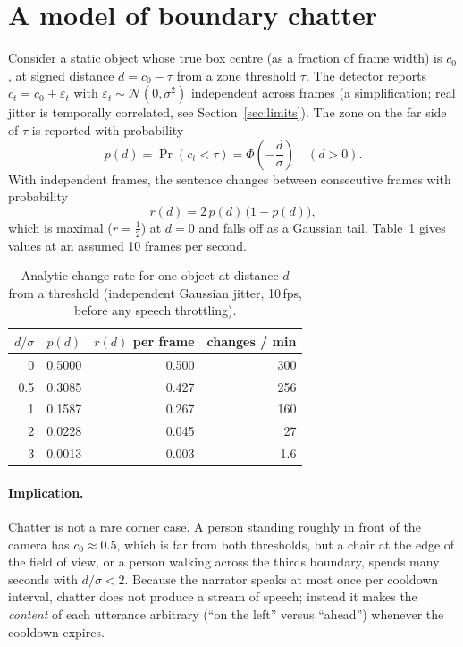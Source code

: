 \documentclass[11pt,a4paper]{article}
\begin{document}
\section{A model of boundary chatter}\label{sec:model}
Consider a static object whose true box centre (as a fraction of frame width) is $c_0$, at signed distance $d = c_0 - \tau$ from a zone threshold $\tau$. The detector reports $c_t = c_0 + \varepsilon_t$ with $\varepsilon_t \sim \mathcal{N}(0,\sigma^2)$ independent across frames (a simplification; real jitter is temporally correlated, see Section~\ref{sec:limits}). The zone on the far side of $\tau$ is reported with probability
\begin{equation}
  p(d) = \Pr(c_t < \tau) = \Phi\!\left(-\frac{d}{\sigma}\right) \quad (d>0).
\end{equation}
With independent frames, the sentence changes between consecutive frames with probability
\begin{equation}
  r(d) = 2\,p(d)\,\bigl(1-p(d)\bigr),
\end{equation}
which is maximal ($r=\tfrac12$) at $d=0$ and falls off as a Gaussian tail. Table~\ref{tab:chatter} gives values at an assumed 10 frames per second.

\begin{table}[h]
\centering
\caption{Analytic change rate for one object at distance $d$ from a threshold (independent Gaussian jitter, 10\,fps, before any speech throttling).}
\label{tab:chatter}
\begin{tabular}{rrrr}
\toprule
$d/\sigma$ & $p(d)$ & $r(d)$ per frame & changes / min \\
\midrule
0   & 0.5000 & 0.500 & 300 \\
0.5 & 0.3085 & 0.427 & 256 \\
1   & 0.1587 & 0.267 & 160 \\
2   & 0.0228 & 0.045 & 27 \\
3   & 0.0013 & 0.003 & 1.6 \\
\bottomrule
\end{tabular}
\end{table}

\paragraph{Implication.} Chatter is not a rare corner case. A person standing roughly in front of the camera has $c_0\approx 0.5$, which is far from both thresholds, but a chair at the edge of the field of view, or a person walking across the thirds boundary, spends many seconds with $d/\sigma<2$. Because the narrator speaks at most once per cooldown interval, chatter does not produce a stream of speech; instead it makes the \emph{content} of each utterance arbitrary (``on the left'' versus ``ahead'') whenever the cooldown expires.
\end{document}

